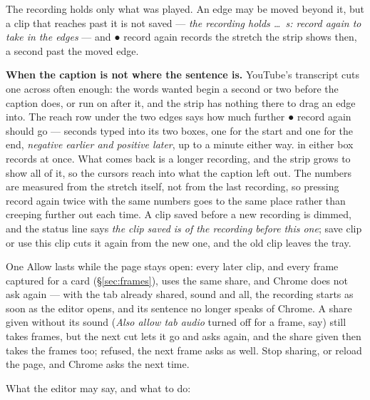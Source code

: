 \documentclass[11pt,oneside]{report}
\newcommand{\sym}[1]{{\symfont #1}}
\newcommand{\key}[1]{\textsf{\small\fbox{#1}}}
\newcommand{\menu}[1]{\textsf{#1}}
\begin{document}
The recording holds only what was played. An edge may be moved beyond it,
but a clip that reaches past it is not saved --- \emph{the recording holds
\ldots\ s: record again to take in the edges} --- and \menu{\sym{●} record
again} records the stretch the strip shows then, a second past the moved
edge.

\textbf{When the caption is not where the sentence is.} YouTube's transcript
cuts one across often enough: the words wanted begin a second or two before
the caption does, or run on after it, and the strip has nothing there to drag
an edge into. The \menu{reach} row under the two edges says how much further
\menu{\sym{●} record again} should go --- seconds typed into its two boxes,
one for the start and one for the end, \emph{negative earlier and positive
later}, up to a minute either way. \key{Enter} in either box records at once.
What comes back is a longer recording, and the strip grows to show all of it,
so the cursors reach into what the caption left out. The numbers are measured
from the stretch itself, not from the last recording, so pressing
\menu{record again} twice with the same numbers goes to the same place rather
than creeping further out each time. A clip saved before a new recording is dimmed, and the status line
says \emph{the clip saved is of the recording before this one};
\menu{save clip} or \menu{use this clip} cuts it again from the new one,
and the old clip leaves the tray.

One \menu{Allow} lasts while the page stays open: every later clip, and
every frame captured for a card (\S\ref{sec:frames}), uses the same share,
and Chrome does not ask again --- with the tab already shared, sound and
all, the recording starts as soon as the editor opens, and its sentence no
longer speaks of Chrome. A share given without its
sound (\emph{Also allow tab audio} turned off for a frame, say) still takes
frames, but the next cut lets it go and asks again, and the share given
then takes the frames too; refused, the next frame asks as well. Stop
sharing, or reload the page, and Chrome asks the next time.

What the editor may say, and what to do:
\end{document}
